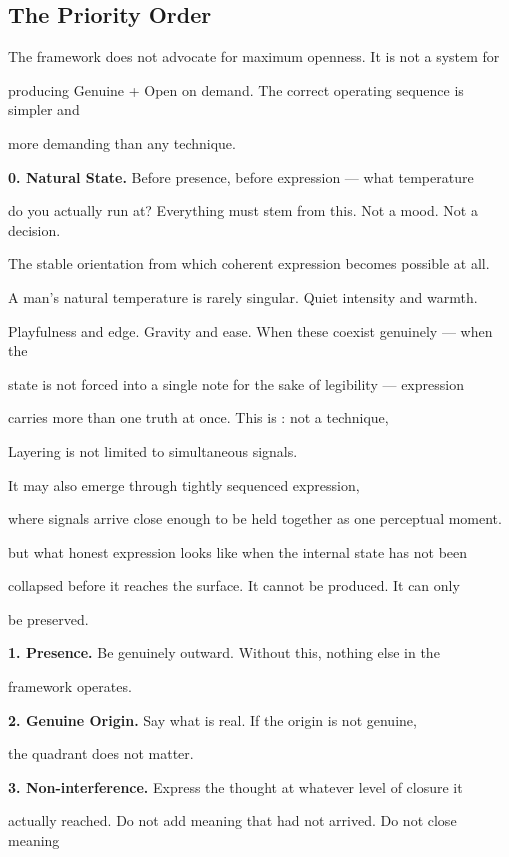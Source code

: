 \subsection{The Priority Order}\label{subsec:priority}

The framework does not advocate for maximum openness. It is not a system for

producing Genuine + Open on demand. The correct operating sequence is simpler and

more demanding than any technique.

\textbf{0. Natural State.} Before presence, before expression --- what temperature

do you actually run at? Everything must stem from this. Not a mood. Not a decision.

The stable orientation from which coherent expression becomes possible at all.

A man's natural temperature is rarely singular. Quiet intensity and warmth.

Playfulness and edge. Gravity and ease. When these coexist genuinely --- when the

state is not forced into a single note for the sake of legibility --- expression

carries more than one truth at once. This is : not a technique,

Layering is not limited to simultaneous signals.

It may also emerge through tightly sequenced expression,

where signals arrive close enough to be held together as one perceptual moment.

but what honest expression looks like when the internal state has not been

collapsed before it reaches the surface. It cannot be produced. It can only

be preserved.

\textbf{1. Presence.} Be genuinely outward. Without this, nothing else in the

framework operates.

\textbf{2. Genuine Origin.} Say what is real. If the origin is not genuine,

the quadrant does not matter.

\textbf{3. Non-interference.} Express the thought at whatever level of closure it

actually reached. Do not add meaning that had not arrived. Do not close meaning

